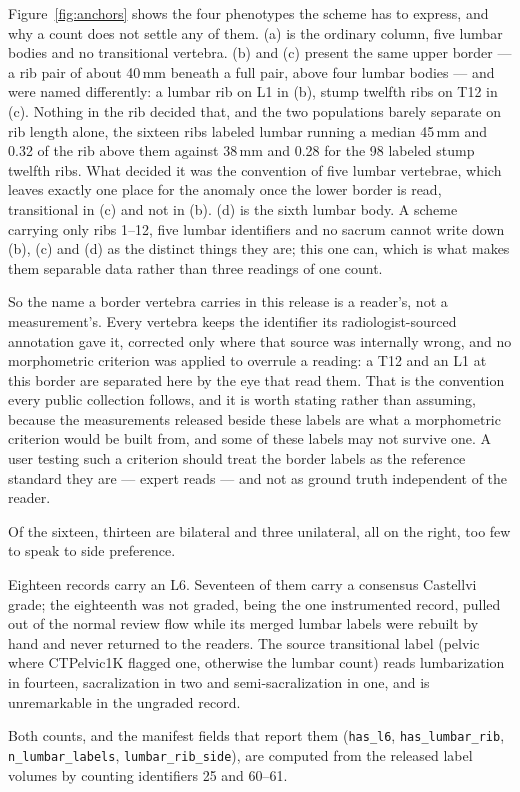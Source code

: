\documentclass[aapm,mph,amsmath,amssymb,preprint,linenumbers]{revtex4-2}
\begin{document}
Figure~\ref{fig:anchors} shows the four phenotypes the scheme has to express, and why a count
does not settle any of them. (a) is the ordinary column, five lumbar bodies and no transitional
vertebra. (b) and (c) present the same upper border --- a rib pair of about 40\,mm beneath a
full pair, above four lumbar bodies --- and were named differently: a lumbar rib on L1 in (b),
stump twelfth ribs on T12 in (c). Nothing in the rib decided that, and the two populations
barely separate on rib length alone, the sixteen ribs labeled lumbar running a median 45\,mm
and 0.32 of the rib above them against 38\,mm and 0.28 for the 98 labeled stump twelfth ribs.
What decided it was the convention of five lumbar vertebrae, which leaves exactly one place for
the anomaly once the lower border is read, transitional in (c) and not in (b). (d) is the
sixth lumbar body. A scheme carrying only ribs 1--12, five lumbar identifiers and no sacrum
cannot write down (b), (c) and (d) as the distinct things they are; this one can, which is what
makes them separable data rather than three readings of one count.

So the name a border vertebra carries in this release is a reader's, not a measurement's. Every
vertebra keeps the identifier its radiologist-sourced annotation gave it, corrected only where
that source was internally wrong, and no morphometric criterion was applied to overrule a
reading: a T12 and an L1 at this border are separated here by the eye that read them. That is
the convention every public collection follows, and it is worth stating rather than assuming,
because the measurements released beside these labels are what a morphometric criterion would
be built from, and some of these labels may not survive one. A user testing such a criterion
should treat the border labels as the reference standard they are --- expert reads --- and not
as ground truth independent of the reader.


Of the sixteen, thirteen are bilateral and three unilateral, all on the right, too few to speak
to side preference.

Eighteen records carry an L6. Seventeen of them carry a consensus Castellvi grade;
the eighteenth was not graded, being the one instrumented record, pulled out of the normal
review flow while its merged lumbar labels were rebuilt by hand and never returned to the
readers. The source transitional label (pelvic where CTPelvic1K flagged one, otherwise the lumbar count) reads lumbarization in fourteen, sacralization in two and semi-sacralization in one, and is unremarkable in the ungraded record. \begin{sloppypar} Both counts, and the manifest fields that report them (\texttt{has\_l6},
\texttt{has\_lumbar\_rib}, \texttt{n\_lumbar\_labels}, \texttt{lumbar\_rib\_side}), are
computed from the released label volumes by counting identifiers 25 and 60--61.
\end{sloppypar}
\end{document}
